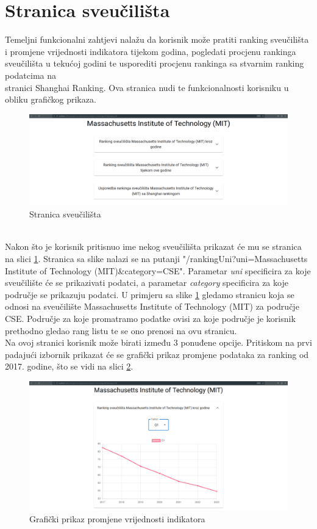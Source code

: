 \documentclass[times, utf8, zavrsni]{fer}
\begin{document}
\section{Stranica sveučilišta}
\label{section:unipagesection}
Temeljni funkcionalni zahtjevi nalažu da korisnik može pratiti ranking sveučilišta i promjene vrijednosti indikatora tijekom godina, pogledati procjenu 
rankinga sveučilišta u tekućoj godini te usporediti procjenu rankinga sa stvarnim ranking podatcima na \\stranici Shanghai Ranking. Ova stranica 
nudi te funkcionalnosti korisniku u obliku grafičkog prikaza. 
\\
\begin{figure}[htb]
    \hspace*{-2cm}  
       \includegraphics[scale=0.21]{unipage.png} 
       \caption{Stranica sveučilišta}
       \label{fig:unipage}
       \end{figure}
\\Nakon što je korisnik pritisnuo ime nekog sveučilišta prikazat će mu se stranica na slici \ref{fig:unipage}. Stranica sa slike nalazi se na putanji 
"/rankingUni?uni=Massachusetts Institute of Technology (MIT)\&category=CSE". Parametar \emph{uni} specificira za koje sveučilište će se prikazivati podatci, a 
parametar \emph{category} specificira za koje područje se prikazuju podatci. U primjeru sa slike \ref{fig:unipage} gledamo stranicu koja se odnosi na sveučilište 
Massachusetts Institute of Technology (MIT) za područje CSE. Područje za koje promatramo podatke ovisi za koje područje je korisnik prethodno gledao 
rang listu te se ono prenosi na ovu stranicu. 
\\Na ovoj stranici korisnik može birati između 3 ponuđene opcije. 
Pritiskom na prvi padajući izbornik prikazat će se grafički prikaz promjene podataka za ranking 
od 2017. godine, što se vidi na slici \ref{fig:unipage1}. 
\begin{figure}[htb]
    \hspace*{-2cm}  
       \includegraphics[scale=0.21]{uni1.png} 
       \caption{Grafički prikaz promjene vrijednosti indikatora}
       \label{fig:unipage1}
       \end{figure}
\end{document}
